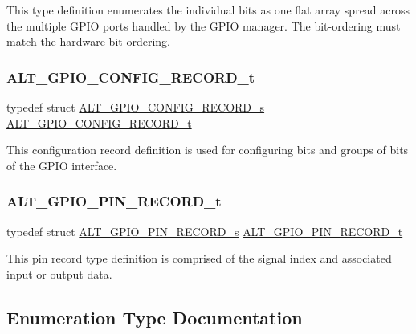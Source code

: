 This type definition enumerates the individual bits as one flat array spread across the multiple G\+P\+IO ports handled by the G\+P\+IO manager. The bit-\/ordering must match the hardware bit-\/ordering. \mbox{\label{group__ALT__GPIO__BITVIEW_ga4f9ae2a8f2479be9005d07d74e1c91fd}} 
\subsubsection{\texorpdfstring{ALT\_GPIO\_CONFIG\_RECORD\_t}{ALT\_GPIO\_CONFIG\_RECORD\_t}}
{\footnotesize\ttfamily typedef struct \mbox{\hyperlink{structALT__GPIO__CONFIG__RECORD__s}{A\+L\+T\+\_\+\+G\+P\+I\+O\+\_\+\+C\+O\+N\+F\+I\+G\+\_\+\+R\+E\+C\+O\+R\+D\+\_\+s}}  \mbox{\hyperlink{group__ALT__GPIO__BITVIEW_ga4f9ae2a8f2479be9005d07d74e1c91fd}{A\+L\+T\+\_\+\+G\+P\+I\+O\+\_\+\+C\+O\+N\+F\+I\+G\+\_\+\+R\+E\+C\+O\+R\+D\+\_\+t}}}

This configuration record definition is used for configuring bits and groups of bits of the G\+P\+IO interface. \mbox{\label{group__ALT__GPIO__BITVIEW_gac0bf685afaa6d2543dc9a1569e663ef7}} 
\subsubsection{\texorpdfstring{ALT\_GPIO\_PIN\_RECORD\_t}{ALT\_GPIO\_PIN\_RECORD\_t}}
{\footnotesize\ttfamily typedef struct \mbox{\hyperlink{structALT__GPIO__PIN__RECORD__s}{A\+L\+T\+\_\+\+G\+P\+I\+O\+\_\+\+P\+I\+N\+\_\+\+R\+E\+C\+O\+R\+D\+\_\+s}}  \mbox{\hyperlink{group__ALT__GPIO__BITVIEW_gac0bf685afaa6d2543dc9a1569e663ef7}{A\+L\+T\+\_\+\+G\+P\+I\+O\+\_\+\+P\+I\+N\+\_\+\+R\+E\+C\+O\+R\+D\+\_\+t}}}

This pin record type definition is comprised of the signal index and associated input or output data. 

\subsection{Enumeration Type Documentation}
\mbox{\label{group__ALT__GPIO__BITVIEW_ga59d65695b346291e584e1a3590520802}} 
